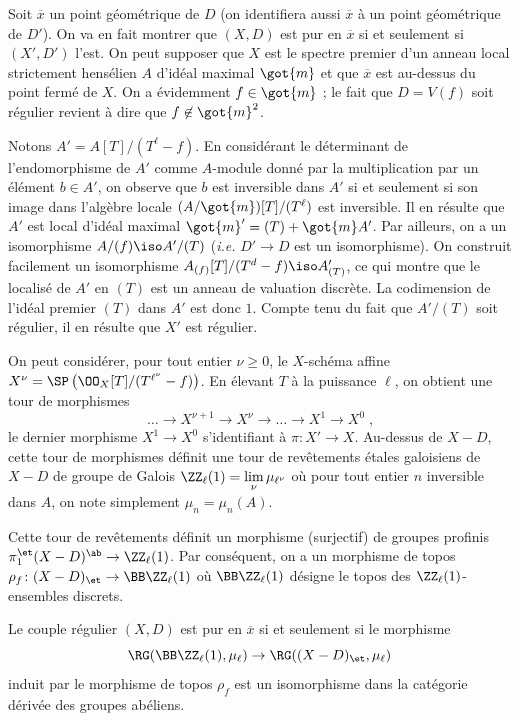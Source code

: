 \documentclass[10pt]{../fichiers-configuration-latex/smfart}
\begin{document}
Soit $\overline x$ un point géométrique de $D$ (on identifiera aussi
$\overline x$ à un point géométrique de $D'$).
On va en fait montrer que
$(X,D)$ est pur en $\overline x$ si et seulement si $(X',D')$
l'est. On peut supposer que $X$ est le spectre premier d'un anneau local
strictement hensélien $A$ d'idéal maximal $\got{m}$ et que $\overline
x$ est au-dessus du point fermé de $X$. On a évidemment $f\in\got{m}$ ;
le fait que $D=V(f)$ soit régulier revient à dire que $f\not\in 
{\got{m}}^2$.

Notons $A'=A[T]/(T^\ell-f)$. En considérant le déterminant de
l'endomorphisme de $A'$ comme $A$-module donné par la multiplication par un
élément $b\in A'$, on observe que $b$ est inversible dans $A'$ si et
seulement si son image dans l'algèbre locale $(A/\got{m})[T]/(T^\ell)$
est inversible. Il en résulte que $A'$ est local d'idéal maximal
$\got{m}'=(T)+\got{m}A'$. Par ailleurs, on a un isomorphisme $A/(f)\iso
A'/(T)$ (\emph{i.e.} $D'\to D$ est un isomorphisme). On construit facilement un
isomorphisme $A_{(f)}[T]/(T^d-f)\iso A'_{(T)}$, ce qui montre que le
localisé de $A'$ en $(T)$ est un anneau de valuation discrète. La
codimension de l'idéal premier $(T)$ dans $A'$ est donc $1$. Compte tenu du
fait que $A'/(T)$ soit régulier, il en résulte que $X'$ est régulier.

On peut considérer, pour tout entier $\nu\geq 0$, le
$X$-schéma affine $X^\nu=\SP\left(\OO_X[T]/(T^{\ell^\nu}-f)\right)$. En élevant $T$ à
la puissance $\ell$, on obtient une tour de morphismes
\[\dots \to X^{\nu+1}\to X^{\nu} \to \dots \to X^1\to X^0\;\text{,}\]
le dernier morphisme $X^1\to X^0$ s'identifiant à $\pi\colon X'\to X$.
Au-dessus de $X-D$, cette tour de morphismes définit une tour de revêtements
étales galoisiens de $X-D$ de groupe de Galois
$\ZZ_\ell(1)=\underset{\nu}\lim\,\mu_{\ell^\nu}$ où pour tout entier $n$
inversible dans $A$, on note simplement $\mu_n=\mu_n(A)$.

Cette tour de revêtements définit un morphisme (surjectif) de groupes
profinis $\pi_1^\et(X-D)^\ab\to \ZZ_\ell(1)$. Par conséquent, on a un morphisme
de topos $\rho_f\colon (X-D)_\et\to \BB\ZZ_\ell(1)$ où $\BB\ZZ_\ell(1)$
désigne le topos des $\ZZ_\ell(1)$-ensembles discrets.

\begin{lemme2}\label{16-lemme-interpretation-purete-diviseur}
Le couple régulier $(X,D)$ est pur en $\overline x$
si et seulement si le morphisme
\[\RG(\BB\ZZ_\ell(1),\mu_\ell)\to\RG((X-D)_\et,
\mu_\ell)\]
induit par le morphisme de topos $\rho_f$ est un isomorphisme dans la
catégorie dérivée des groupes abéliens.
\end{lemme2}
\end{document}
